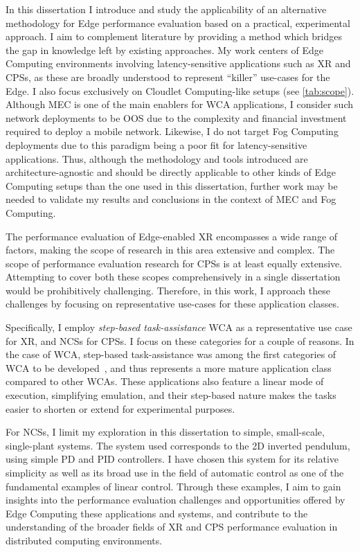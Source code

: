 In this dissertation I introduce and study the applicability of an alternative methodology for Edge performance evaluation based on a practical, experimental approach.
I aim to complement literature by providing a method which bridges the gap in knowledge left by existing approaches.
My work centers of Edge Computing environments involving latency-sensitive applications such as \gls{XR} and \glspl{CPS}, as these are broadly understood to represent ``killer'' use-cases for the Edge.
I also focus exclusively on Cloudlet Computing-like setups (see \cref{tab:scope}).
Although \gls{MEC} is one of the main enablers for \gls{WCA} applications, I consider such network deployments to be \gls{OOS} due to the complexity and financial investment required to deploy a mobile network.
Likewise, I do not target Fog Computing deployments due to this paradigm being a poor fit for latency-sensitive applications.
Thus, although the methodology and tools introduced are architecture-agnostic and should be directly applicable to other kinds of Edge Computing setups than the one used in this dissertation, further work may be needed to validate my results and conclusions in the context of \gls{MEC} and Fog Computing.

The performance evaluation of Edge-enabled \gls{XR} encompasses a wide range of factors, making the scope of research in this area extensive and complex.
The scope of performance evaluation research for \glspl{CPS} is at least equally extensive.
Attempting to cover both these scopes comprehensively in a single dissertation would be prohibitively challenging.
Therefore, in this work, I approach these challenges by focusing on representative use-cases for these application classes.

Specifically, I employ \emph{step-based task-assistance} \gls{WCA} as a representative use case for \gls{XR}, and \glspl{NCS} for \glspl{CPS}.
I focus on these categories for a couple of reasons.
In the case of \gls{WCA}, step-based task-assistance was among the first categories of \gls{WCA} to be developed~\cite{chen2015early}, and thus represents a more mature application class compared to other \glspl{WCA}.
These applications also feature a linear mode of execution, simplifying emulation, and their step-based nature makes the tasks easier to shorten or extend for experimental purposes.

For \glspl{NCS}, I limit my exploration in this dissertation to simple, small-scale, single-plant systems.
The system used corresponds to the \gls{2D} inverted pendulum, using simple \gls{PD} and \gls{PID} controllers.
I have chosen this system for its relative simplicity as well as its broad use in the field of automatic control as one of the fundamental examples of linear control.
Through these examples, I aim to gain insights into the performance evaluation challenges and opportunities offered by Edge Computing these applications and systems, and contribute to the understanding of the broader fields of \gls{XR} and \gls{CPS} performance evaluation in distributed computing environments.

